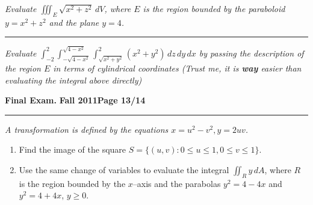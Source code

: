 \documentclass[12pt]{article}
\begin{document}
\bigskip
{\problem[10 pts] \em Evaluate $\iiint_E \sqrt{x^2+z^2}\, dV$, where
  $E$ is the region bounded by the paraboloid $y=x^2+z^2$ and the
  plane $y=4$.}
\vspace{8cm}
\begin{flushright}
\end{flushright}
\hrule
{\problem[15 pts] \em Evaluate $\int_{-2}^2
  \int_{-\sqrt{4-x^2}}^{\sqrt{4-x^2}} \int_{\sqrt{x^2+y^2}}^2
  (x^2+y^2)\, dz\, dy\, dx$ by passing the description of the region
  $E$ in terms of cylindrical coordinates (Trust me, it is
  \textbf{way} easier than evaluating the integral above directly)}
\vspace{8cm}
\begin{flushright}
\end{flushright}
\newpage

\hfill{\large\bf Final Exam.}\hfill{\large\bf
  Fall 2011}\hfill{\large\bf Page 13/14}\hrule

\bigskip
{\problem[20 pts] \em A transformation is defined by the equations
  $x=u^2-v^2, y=2uv$.}
\begin{enumerate}
\item Find the image of the square $S=\big\{ (u,v) : 0 \leq u \leq 1,
  0 \leq v \leq 1 \big\}$.
\item Use the same change of variables to evaluate the integral
  $\iint_R y\, dA$, where $R$ is the region bounded by the $x$--axis
  and the parabolas $y^2=4-4x$ and $y^2=4+4x$, $y\geq 0$.
\end{enumerate}
\vspace{14.5cm}
\begin{flushright}
\end{flushright}
\end{document}
